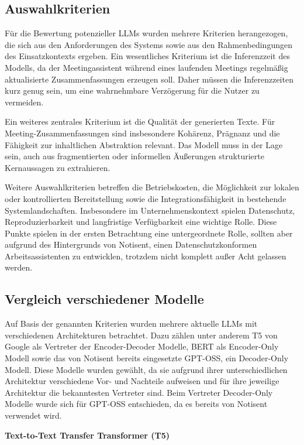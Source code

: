 \subsection{Auswahlkriterien} 
Für die Bewertung potenzieller LLMs wurden mehrere Kriterien herangezogen, die sich aus den Anforderungen des Systems sowie aus den Rahmenbedingungen des Einsatzkontexts ergeben. Ein wesentliches Kriterium ist die Inferenzzeit des Modells, da der Meetingassistent während eines laufenden Meetings regelmäßig aktualisierte Zusammenfassungen erzeugen soll. Daher müssen die Inferenzzeiten kurz genug sein, um eine wahrnehmbare Verzögerung für die Nutzer zu vermeiden. 

Ein weiteres zentrales Kriterium ist die Qualität der generierten Texte. Für Meeting-Zusammenfassungen sind insbesondere Kohärenz, Prägnanz und die Fähigkeit zur inhaltlichen Abstraktion relevant. Das Modell muss in der Lage sein, auch aus fragmentierten oder informellen Äußerungen strukturierte Kernaussagen zu extrahieren.

Weitere Auswahlkriterien betreffen die Betriebskosten, die Möglichkeit zur lokalen oder kontrollierten Bereitstellung sowie die Integrationsfähigkeit in bestehende Systemlandschaften. Insbesondere im Unternehmenskontext spielen Datenschutz, Reproduzierbarkeit und langfristige Verfügbarkeit eine wichtige Rolle. Diese Punkte spielen in der ersten Betrachtung eine untergeordnete Rolle, sollten aber aufgrund des Hintergrunds von Notisent, einen Datenschutzkonformen Arbeitsassistenten zu entwicklen, trotzdem nicht komplett außer Acht gelassen werden. 

\newpage
\subsection{Vergleich verschiedener Modelle} 
Auf Basis der genannten Kriterien wurden mehrere aktuelle LLMs mit verschiedenen Architekturen betrachtet. Dazu zählen unter anderem T5 von Google als Vertreter der Encoder-Decoder Modelle, BERT als Encoder-Only Modell sowie das von Notisent bereits eingesetzte GPT-OSS, ein Decoder-Only Modell.  Diese Modelle wurden gewählt, da sie aufgrund ihrer unterschiedlichen Architektur verschiedene Vor- und Nachteile aufweisen und für ihre jeweilige Architektur die bekanntesten Vertreter sind. Beim Vertreter  Decoder-Only Modelle wurde sich für GPT-OSS entschieden, da es bereits von Notisent verwendet wird.

\textbf{Text-to-Text Transfer Transformer (T5)}

